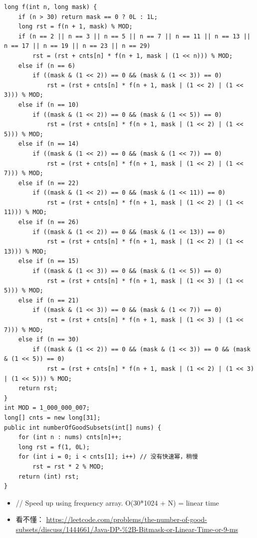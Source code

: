 \documentclass[9pt, b5paaper]{book}
\begin{document}
\begin{verbatim}
long f(int n, long mask) {
    if (n > 30) return mask == 0 ? 0L : 1L;
    long rst = f(n + 1, mask) % MOD;
    if (n == 2 || n == 3 || n == 5 || n == 7 || n == 11 || n == 13 || n == 17 || n == 19 || n == 23 || n == 29) 
        rst = (rst + cnts[n] * f(n + 1, mask | (1 << n))) % MOD;
    else if (n == 6) 
        if ((mask & (1 << 2)) == 0 && (mask & (1 << 3)) == 0)
            rst = (rst + cnts[n] * f(n + 1, mask | (1 << 2) | (1 << 3))) % MOD;
    else if (n == 10) 
        if ((mask & (1 << 2)) == 0 && (mask & (1 << 5)) == 0)
            rst = (rst + cnts[n] * f(n + 1, mask | (1 << 2) | (1 << 5))) % MOD;
    else if (n == 14) 
        if ((mask & (1 << 2)) == 0 && (mask & (1 << 7)) == 0)
            rst = (rst + cnts[n] * f(n + 1, mask | (1 << 2) | (1 << 7))) % MOD;
    else if (n == 22) 
        if ((mask & (1 << 2)) == 0 && (mask & (1 << 11)) == 0)
            rst = (rst + cnts[n] * f(n + 1, mask | (1 << 2) | (1 << 11))) % MOD;
    else if (n == 26) 
        if ((mask & (1 << 2)) == 0 && (mask & (1 << 13)) == 0)
            rst = (rst + cnts[n] * f(n + 1, mask | (1 << 2) | (1 << 13))) % MOD;
    else if (n == 15) 
        if ((mask & (1 << 3)) == 0 && (mask & (1 << 5)) == 0)
            rst = (rst + cnts[n] * f(n + 1, mask | (1 << 3) | (1 << 5))) % MOD;
    else if (n == 21) 
        if ((mask & (1 << 3)) == 0 && (mask & (1 << 7)) == 0)
            rst = (rst + cnts[n] * f(n + 1, mask | (1 << 3) | (1 << 7))) % MOD;
    else if (n == 30) 
        if ((mask & (1 << 2)) == 0 && (mask & (1 << 3)) == 0 && (mask & (1 << 5)) == 0)
            rst = (rst + cnts[n] * f(n + 1, mask | (1 << 2) | (1 << 3) | (1 << 5))) % MOD;
    return rst;
}
int MOD = 1_000_000_007;
long[] cnts = new long[31];
public int numberOfGoodSubsets(int[] nums) {
    for (int n : nums) cnts[n]++;
    long rst = f(1, 0L);
    for (int i = 0; i < cnts[1]; i++) // 没有快速幂，稍慢
        rst = rst * 2 % MOD;
    return (int) rst;
}
\end{verbatim}
\begin{itemize}
\item // Speed up using frequency array. O(30*1024 + N) = linear time
\item 看不懂： \url{https://leetcode.com/problems/the-number-of-good-subsets/discuss/1444661/Java-DP-\%2B-Bitmask-or-Linear-Time-or-9-ms}
\end{itemize}
\end{document}
